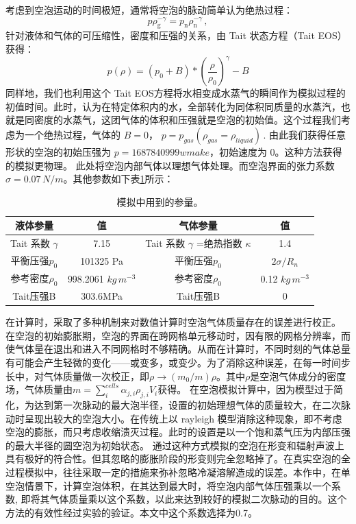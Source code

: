 考虑到空泡运动的时间极短，通常将空泡的脉动简单认为绝热过程：$$
p\rho_\mathrm{g}^{-\gamma}=p_\mathrm{n}\rho_\mathrm{n}^{-\gamma}\,,$$
针对液体和气体的可压缩性，密度和压强的关系，由 Tait 状态方程（Tait
EOS）获得：  $$p(\rho) = (p_0 + B)*(\frac{\rho}{\rho_0})^\gamma - B$$
同样地，我们也利用这个 Tait
EOS方程将水相变成水蒸气的瞬间作为模拟过程的初值时间。此时，认为在特定体积内的水，全部转化为同体积同质量的水蒸汽，也就是同密度的水蒸气，这团气体的体积和压强就是空泡的初始值。这个过程我们考虑为一个绝热过程，气体的
$B=0$，
 $p = p_{gas}(\rho_{gas} = \rho_{liquid})\,$.
由此我们获得任意形状的空泡的初始压强为 $p = 1687840999 wmake$，初始速度为
0。这种方法获得的模拟更物理。
此处将空泡内部气体以理想气体处理。而空泡界面的张力系数
$\sigma =0.07\,N/m$。其他参数如下表\ref{tab2.1}所示：
\begin{table}[htp]
    \centering
    \begin{tabular}{|c|c|c|c|}
    \hline
    \textbf{液体参量}&\textbf{值}&\textbf{气体参量}&\textbf{值}\\
    \hline
    Tait 系数 $\gamma$ &7.15&  Tait 系数 $\gamma$ =绝热指数 $\kappa$ & 1.4\\
    \hline
    平衡压强$p_0$& 101325 Pa & 平衡压强$p_0$ & $2\sigma/R_n$ \\
    \hline
 参考密度$\rho_0$ & 998.2061 $kg\, m^{−3}$ &参考密度$\rho_0$& 0.12  $kg\, m^{−3}$ \\
 \hline
Tait压强B &  303.6MPa & Tait压强B & 0\\
  \hline
    \end{tabular}
    \caption[模拟中用到的参量]{模拟中用到的参量。}
    \label{tab2.1}
\end{table}


在计算时，采取了多种机制来对数值计算时空泡气体质量存在的误差进行校正。
在空泡的初始膨胀期，空泡的界面在跨网格单元移动时，因有限的网格分辨率，而使气体量在退出和进入不同网格时不够精确。从而在计算时，不同时刻的气体总量有可能会产生轻微的变化------或变多，或变少。为了消除这种误差，在每一时间步长中，对气体质量做一次校正，即$\rho\rightarrow (m_0/m)\rho$。其中$\rho$是空泡气体成分的密度场，气体质量由$m=\sum_{i}^{c e l l s} \alpha_{j, i} \rho_{j, i} V_{i}$获得。
在空泡模拟计算中，因为模型过于简化，为达到第一次脉动的最大泡半径，设置的初始理想气体的质量较大，在二次脉动时呈现出较大的空泡大小。在传统上以
rayleigh
模型消除这种现象，即不考虑空泡的膨胀，而只考虑收缩溃灭过程。此时的设置是以一个饱和蒸气压为内部压强的最大半径的圆空泡为初始状态。\cite{lauterborn_bubble_2018}
通过这种方式模拟的空泡在形变和辐射声波上具有极好的符合性。但其忽略的膨胀阶段的形变则完全忽略掉了。在真实空泡的全过程模拟中，往往采取一定的措施来弥补忽略冷凝溶解造成的误差。本作中，在单空泡情景下，计算空泡体积，在其达到最大时，将空泡内部气体压强乘以一个系数\cite{rossello_dynamics_2022,koch_numerical_2016},
即将其气体质量乘以这个系数，以此来达到较好的模拟二次脉动的目的。这个方法的有效性经过实验的验证\cite{reese_microscopic_2022-1}。本文中这个系数选择为0.7。

